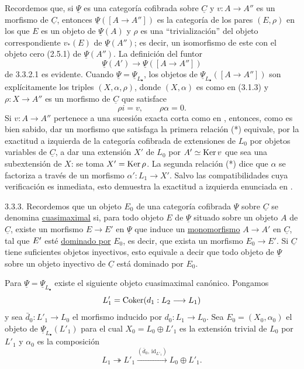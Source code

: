 Recordemos que, si $\underline\Psi$ es una categoría cofibrada sobre
$\underline C$ y $v:A\longrightarrow A''$ es un morfismo de
$\underline C$, entonces $\underline\Psi([A\longrightarrow A''])$ es
la categoría de los pares $(E,\rho)$ en los que $E$ es un objeto de
$\underline\Psi(A)$ y $\rho$ es una ``trivialización'' del objeto
correspondiente $v_*(E)$ de $\underline\Psi(A'')$; es decir, un
isomorfismo de este con el objeto cero (2.5.1) de
$\underline\Psi(A'')$. La definición del funtor
\[
 \underline\Psi(A')\longrightarrow
 \underline\Psi([A\longrightarrow A''])
\]
de 3.3.2.1 es evidente. Cuando
$\underline\Psi=\underline\Psi_{L_\bullet}$, los objetos de
$\underline\Psi_{L_\bullet}([A\longrightarrow A''])$ son
explícitamente los triples $(X,\alpha,\rho)$, donde $(X,\alpha)$ es
como en (3.1.3) y $\rho:X\longrightarrow A''$ es un morfismo de
$\underline C$ que satisface
\begin{equation}\tag{*}
 \rho i=v,\qquad \rho\alpha=0.
\end{equation}
Si $v:A\longrightarrow A''$ pertenece a una sucesión exacta corta como
en , entonces, como es bien sabido, dar un
morfismo que satisfaga la primera relación (*) equivale, por la
exactitud a izquierda de la categoría cofibrada de extensiones de
$L_0$ por objetos variables de $\underline C$, a dar una extensión
$X'$ de $L_0$ por $A'\simeq\Ker v$ que sea una subextensión de $X$:
se toma $X'=\Ker\rho$. La segunda relación (*) dice que $\alpha$ se
factoriza a través de un morfismo
$\alpha':L_1\longrightarrow X'$. Salvo las compatibilidades cuya
verificación es inmediata, esto demuestra la exactitud a izquierda
enunciada en .

3.3.3. Recordemos que un objeto $E_0$ de una categoría cofibrada
$\underline\Psi$ sobre $\underline C$ se denomina
\underline{cuasimaximal} si, para todo objeto $E$ de
$\underline\Psi$ situado sobre un objeto $A$ de $\underline C$,
existe un morfismo $E\longrightarrow E'$ en $\underline\Psi$ que
induce un \underline{monomorfismo} $A\longrightarrow A'$ en
$\underline C$, tal que $\sisi{E}{E'}$ esté \underline{dominado por} $E_0$, es
decir, que exista un morfismo $E_0\longrightarrow E'$. Si
$\underline C$ tiene suficientes objetos inyectivos, esto equivale a
decir que todo objeto de $\underline\Psi$ sobre un objeto inyectivo de
$\underline C$ está dominado por $E_0$.

Para $\underline\Psi=\underline\Psi_{L_\bullet}$ existe el siguiente
objeto cuasimaximal canónico. Pongamos
\[
 L'_1=\Coker(d_1:L_2\longrightarrow L_1)
\]
y sea $\bar d_0:L'_1\longrightarrow L_0$ el morfismo inducido por
$d_0:L_1\longrightarrow L_0$. Sea $E_0=(X_0,\alpha_0)$ el objeto de
$\underline\Psi_{L_\bullet}(L'_1)$ para el cual
$X_0=L_0\oplus L'_1$ es la extensión trivial de $L_0$ por $L'_1$ y
$\alpha_0$ es la composición
\[
 L_1\twoheadrightarrow L'_1
 \xrightarrow{(\bar d_0,\,\mathrm{id}_{L'_1})}
 L_0\oplus L'_1.
\]

